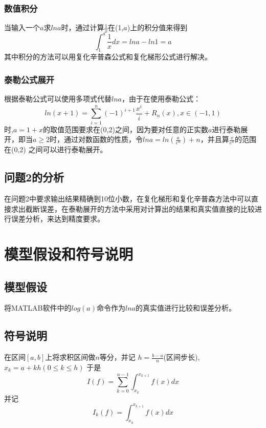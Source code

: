\documentclass[UTF8]{ctexart}
\begin{document}
			\subsubsection{数值积分} %
	当输入一个$a$求$lna$时，通过计算$\frac{1}{x}$在(1,$a$)上的积分值来得到
	$$	\int_1 ^a \frac{1}{x} dx = lna -ln1 =a $$
	其中积分的方法可以用复化辛普森公式和复化梯形公式进行解决。
			\subsubsection{泰勒公式展开} %
	根据泰勒公式可以使用多项式代替$lna$，由于在使用泰勒公式：
		\begin{equation}
			\label{taile}%
			ln(x+1)= \sum_{i=1}^{n} (-1)^{i+1} \frac{x^i}{i}+R_n(x),x\in(-1,1)          
		\end{equation}	
	时,$a=1+x$的取值范围要求在(0,2)之间，因为要对任意的正实数$a$进行泰勒展开，即当$a\ge2$时，通过对数函数的性质，令$lna=ln(\frac{a}{e^n})+n$，并且算$\frac{x}{e^n}$的范围在(0,2) 之间可以进行泰勒展开。
	
		\subsection{问题2的分析} %
		在问题2中要求输出结果精确到10位小数，在复化梯形和复化辛普森方法中可以直接求出截断误差，在泰勒展开的方法中采用对计算出的结果和真实值直接的比较进行误差分析，来达到精度要求。
	
	\section{模型假设和符号说明} %
		\subsection{模型假设} %
		将MATLAB软件中的$log(a)$命令作为$lna$的真实值进行比较和误差分析。
		\subsection{符号说明} %
	在区间$[a,b]$上将求积区间做$n$等分，并记 $h=\frac{b-a}{n}$(区间步长),$x_k = a+kh (0\leq k\leq h)$ 于是
	$$	I(f)=\sum_{k=0}^{n-1}\int_{x_k}^{x_{k+1}}f(x)dx $$
	并记
	$$	I_{k}(f)=\int_{x_k}^{x_{k+1}}f(x)dx $$
	
\end{document}
